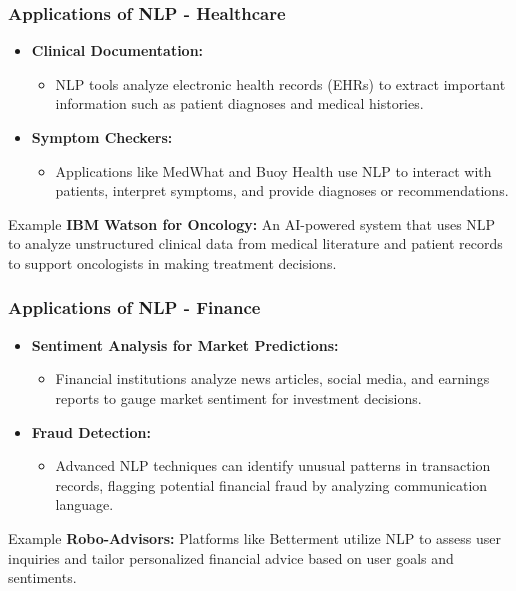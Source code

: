 \documentclass[aspectratio=169]{beamer}
\begin{document}
\begin{frame}[fragile]
    \frametitle{Applications of NLP - Healthcare}
    \begin{itemize}
        \item \textbf{Clinical Documentation:} 
            \begin{itemize}
                \item NLP tools analyze electronic health records (EHRs) to extract important information such as patient diagnoses and medical histories.
            \end{itemize}
        \item \textbf{Symptom Checkers:} 
            \begin{itemize}
                \item Applications like MedWhat and Buoy Health use NLP to interact with patients, interpret symptoms, and provide diagnoses or recommendations.
            \end{itemize}
    \end{itemize}

    \begin{block}{Example}
        \textbf{IBM Watson for Oncology:} An AI-powered system that uses NLP to analyze unstructured clinical data from medical literature and patient records to support oncologists in making treatment decisions.
    \end{block}
\end{frame}

\begin{frame}[fragile]
    \frametitle{Applications of NLP - Finance}
    \begin{itemize}
        \item \textbf{Sentiment Analysis for Market Predictions:} 
            \begin{itemize}
                \item Financial institutions analyze news articles, social media, and earnings reports to gauge market sentiment for investment decisions.
            \end{itemize}
        \item \textbf{Fraud Detection:} 
            \begin{itemize}
                \item Advanced NLP techniques can identify unusual patterns in transaction records, flagging potential financial fraud by analyzing communication language.
            \end{itemize}
    \end{itemize}

    \begin{block}{Example}
        \textbf{Robo-Advisors:} Platforms like Betterment utilize NLP to assess user inquiries and tailor personalized financial advice based on user goals and sentiments.
    \end{block}
\end{frame}
\end{document}
